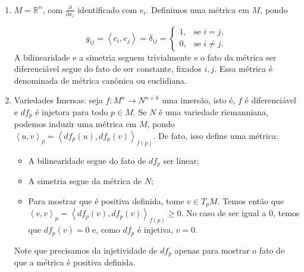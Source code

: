 
\begin{examples}
	$ $
	\label{ex:metricas-isometrias}
	\begin{enumerate}
		\item $M=\mathbb{R}^{n}$, com $\frac{\partial}{\partial x_{i}}$ identificado com $e_{i}$. Definimos uma métrica em  $M$, pondo

		      \begin{equation*}
			      g_{ij}=\left< e_{i}, e_{j} \right>= \delta_{ij}= \begin{cases} 1, & \text{se } i=j,\\ 0, & \text{se } i\neq j. \end{cases}
		      \end{equation*}
		      A bilinearidade e a simetria seguem trivialmente e o fato da métrica ser diferenciável segue do fato de ser constante, fixados $i,j$. Essa métrica é denominada de métrica canônica ou euclidiana.
		\item Variedades Imersas:
		      seja $f:M^{n}\to N^{n+k}$ uma imersão, isto é, $f$ é diferenciável e $df_{p}$ é injetora para todo $p \in M$.
		      Se $N$ é uma variedade riemanniana, podemos induzir uma métrica em $M$, pondo $\left< u, v \right>_{p}=\left< df_{p}(u), df_{p}(v) \right>_{f(p)}$. De fato, isso define uma métrica:
		      \begin{itemize}
			      \item A bilinearidade segue do fato de $df_{p}$ ser linear;
			      \item A simetria segue da métrica de $N$;
			      \item Para mostrar que é positiva definida, tome $v \in T_{p}M$. Temos então que $\left< v, v \right>_{p}=\left< df_{p}(v), df_{p}(v) \right>_{f(p)}\geq0$. No caso de ser igual a $0$, temos que $df_{p}(v)=0$ e, como $df_{p}$ é injetiva, $v=0$.
		      \end{itemize}

		      Note que precisamos da injetividade de $df_{p}$ apenas para mostrar o fato de que a métrica é positiva definida.


\end{enumerate}
\end{examples}
